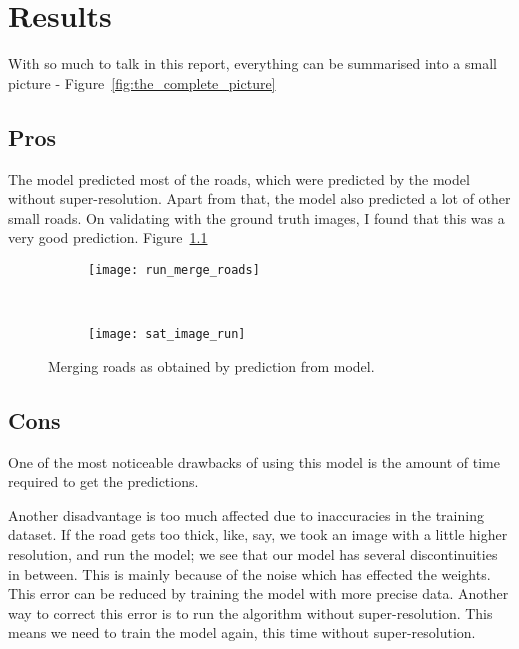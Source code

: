 \chapter{Results}\label{chapt:results}

With so much to talk in this report, everything can be summarised into a small picture - Figure~\ref{fig:the_complete_picture}

\section{Pros}
The model predicted most of the roads, which were predicted by the model without super-resolution. Apart from that, the model also predicted a lot of other small roads. On validating with the ground truth images, I found that this was a very good prediction. Figure~\ref{fig:run_merge_road_maps}

\begin{figure}[h!]
  \centering
  \begin{subfigure}{0.71\textwidth}
    \texttt{[image: run\_merge\_roads]}
    \caption{}
  \end{subfigure}~
  \begin{subfigure}{0.29\textwidth}
    \texttt{[image: sat\_image\_run]}
    \caption{}
  \end{subfigure}
  \caption[Finding likeliness of roads by combining results from different models]{Merging roads as obtained by prediction from model.}
  \label{fig:run_merge_road_maps}
\end{figure}



\section{Cons}
One of the most noticeable drawbacks of using this model is the amount of time required to get the predictions. 

Another disadvantage is too much affected due to inaccuracies in the training dataset. If the road gets too thick, like, say, we took an image with a little higher resolution, and run the model; we see that our model has several discontinuities in between. This is mainly because of the noise which has effected the weights. This error can be reduced by training the model with more precise data. Another way to correct this error is to run the algorithm without super-resolution. This means we need to train the model again, this time without super-resolution.

